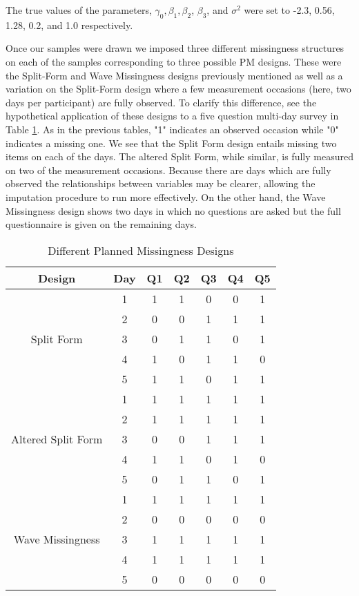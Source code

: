 \documentclass{svjour3}                     %
\begin{document}
The true values of the parameters, $\gamma_0, \beta_1, \beta_2$, $\beta_3$, and $\sigma^2$ were set to -2.3, 0.56, 1.28, 0.2, and 1.0 respectively. \par
Once our samples were drawn we imposed three different missingness structures on each of the samples corresponding to three possible PM designs. These were the Split-Form and Wave Missingness designs previously mentioned as well as a variation on the Split-Form design where a few measurement occasions (here, two days per participant) are fully observed. To clarify this difference, see the hypothetical application of these designs to a five question multi-day survey in Table \ref{tab:table14}. As in the previous tables, "1" indicates an observed occasion while "0" indicates a missing one. We see that the Split Form design entails missing two items on each of the days. The altered Split Form, while similar, is fully measured on two of the measurement occasions. Because there are days which are fully observed the relationships between variables may be clearer, allowing the imputation procedure to run more effectively. On the other hand, the Wave Missingness design shows two days in which no questions are asked but the full questionnaire is given on the remaining days. \par

\begin{table}[t!]
	\centering
	\caption{Different Planned Missingness Designs}
	\setlength{\tabcolsep}{0.45cm}
	\label{tab:table14}
	\hspace*{-1cm}
	\begin{tabular}{c|c|ccccc}
		\toprule
		Design & Day & Q1 & Q2 & Q3 & Q4 & Q5 \\
		\midrule
		\multirow{5}{*}{Split Form}
		& 1 & 1 & 1 & 0 & 0 & 1 \\
		& 2 & 0 & 0 & 1 & 1 & 1 \\
		& 3 & 0 & 1 & 1 & 0 & 1 \\
		& 4 & 1 & 0 & 1 & 1 & 0 \\
		& 5 & 1 & 1 & 0 & 1 & 1 \\
		\midrule
		\midrule
		\multirow{5}{*}{Altered Split Form}
		& 1 & 1 & 1 & 1 & 1 & 1 \\
		& 2 & 1 & 1 & 1 & 1 & 1 \\
		& 3 & 0 & 0 & 1 & 1 & 1 \\
		& 4 & 1 & 1 & 0 & 1 & 0 \\
		& 5 & 0 & 1 & 1 & 0 & 1 \\
		\midrule
		\midrule
		\multirow{5}{*}{Wave Missingness}
		& 1 & 1 & 1 & 1 & 1 & 1 \\
		& 2 & 0 & 0 & 0 & 0 & 0 \\
		& 3 & 1 & 1 & 1 & 1 & 1 \\
		& 4 & 1 & 1 & 1 & 1 & 1 \\
		& 5 & 0 & 0 & 0 & 0 & 0 \\
		\bottomrule
	\end{tabular}
	\hspace*{-1cm}	
\end{table}
\end{document}
